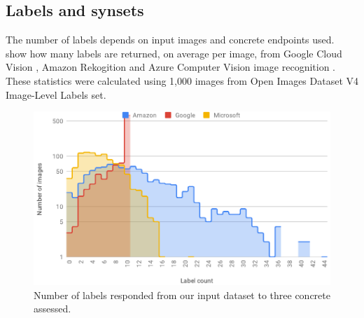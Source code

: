 \subsection{Labels and synsets}\label{icwe2019:sec:label-synsets}

The number of labels depends on input images and concrete  endpoints used.
 show how many labels are returned, on average per image, from Google Cloud Vision , Amazon Rekogition  and Azure Computer Vision  image recognition . These statistics were calculated using 1,000 images from Open Images Dataset V4  Image-Level Labels set.

\begin{table}
\caption[Statistics for the number of labels]{Statistics for the number of labels, on average, per service identified.}\label{icwe2019:tab:label-count}
\centering
{}
\end{table}

\begin{figure}
\centering\includegraphics[width=.9\linewidth]{label_count1}
\caption[Label counts per  assessed]{Number of labels responded from our input dataset to three concrete  assessed.}
\label{icwe2019:fig:label-count1}
\end{figure}

